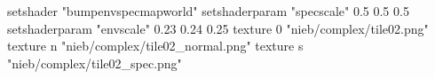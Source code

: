 setshader "bumpenvspecmapworld"
setshaderparam "specscale" 0.5 0.5 0.5
setshaderparam "envscale"  0.23 0.24 0.25
   texture 0 "nieb/complex/tile02.png"
   texture n "nieb/complex/tile02_normal.png"
   texture s "nieb/complex/tile02_spec.png"